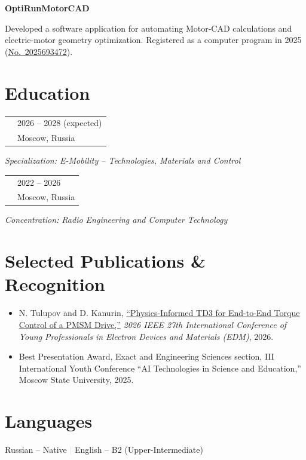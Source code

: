 \documentclass[10pt,a4paper]{article}
\makeatletter
\newcommand{\cvrole}[4]{%
  \begin{tabularx}{\textwidth}{@{}>{\raggedright\arraybackslash}X
    >{\raggedleft\arraybackslash}p{0.27\textwidth}@{}}
    {\sffamily\bfseries #1} & {\small\color{textgray}#4} \\
    {\itshape #2} & {\small\color{lightgray}#3}
  \end{tabularx}
  \vspace{0.12em}
}
\newcommand{\project}[2]{%
  \needspace{3\baselineskip}
  {\sffamily\bfseries #1}\par
  \vspace{0.12em}
  #2
}
\makeatother
\begin{document}
\vspace{0.25em}
\project{OptiRunMotorCAD}{
  Developed a software application for automating Motor-CAD calculations and
  electric-motor geometry optimization. Registered as a computer program in
  2025
  (\href{https://new.fips.ru/registers-doc-view/fips_servlet?DB=EVM\&DocNumber=2025693472\&TypeFile=html}{No.~2025693472}).
}

\section{Education}

\cvrole{Moscow Institute of Physics and Technology}
       {M.Sc. in Applied Mathematics and Physics}
       {Moscow, Russia}{2026 -- 2028 (expected)}
{\small\textit{Specialization: E-Mobility -- Technologies, Materials and Control}}\par
\vspace{0.25em}
\cvrole{Moscow Institute of Physics and Technology}
       {B.Sc. in Applied Mathematics and Physics}
       {Moscow, Russia}{2022 -- 2026}
{\small\textit{Concentration: Radio Engineering and Computer Technology}}\par

\section{Selected Publications \& Recognition}

\begin{itemize}
  \item N. Tulupov and D. Kanurin,
        \href{https://doi.org/10.1109/EDM69524.2026.11632234}{``Physics-Informed TD3 for End-to-End Torque Control of a PMSM Drive,''}
        \textit{2026 IEEE 27th International Conference of Young Professionals
        in Electron Devices and Materials (EDM)}, 2026.
  \item Best Presentation Award, Exact and Engineering Sciences section,
        III International Youth Conference ``AI Technologies in Science and
        Education,'' Moscow State University, 2025.
\end{itemize}

\section{Languages}

Russian -- Native \hspace{1.4em}\textcolor{lightgray}{|}\hspace{1.4em}
English -- B2 (Upper-Intermediate)
\end{document}
